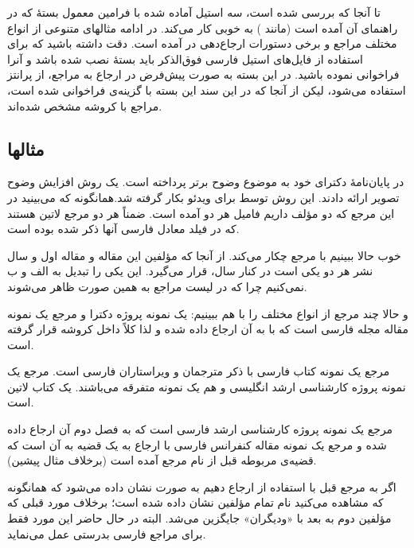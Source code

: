 \documentclass[a4paper]{article}
\theoremstyle{plain}\newtheorem{question}{پرسش}
\begin{document}
تا آنجا که بررسی شده است، سه استیل آماده شده با فرامین معمول بستهٔ  که در راهنمای آن آمده است (مانند ) به خوبی کار می‌کند. در ادامه مثالهای متنوعی از انواع مختلف مراجع و برخی دستورات ارجاع‌دهی در  آمده است. دقت داشته باشید که  برای استفاده از فایل‌های استیل فارسی فوق‌الذکر باید بستهٔ  نصب شده باشد و آنرا فراخوانی نموده باشید. در این بسته به صورت پیش‌فرض در ارجاع به مراجع، از پرانتز استفاده می‌شود، لیکن از آنجا که در این سند این بسته با گزینه‌ی  فراخوانی شده است، مراجع با کروشه مشخص شده‌اند. 

\subsection{مثالها}\label{Sec:examples}

\citet{Borman04thesis} در پایان‌نامهٔ دکترای خود به موضوع وضوح برتر پرداخته است.
\citet{Amintoosi09precise} یک روش افزایش وضوح تصویر ارائه دادند. این روش توسط \citet{Amintoosi09video} برای ویدئو بکار گرفته شد.همانگونه که می‌بینید در این مرجع که دو مؤلف داریم فامیل هر دو آمده است. ضمناً هر دو مرجع لاتین هستند که در فیلد  معادل فارسی آنها ذکر شده بوده است.

خوب حالا ببینیم با مرجع \citep{Amintoosi09regional} چکار می‌کند. از آنجا که مؤلفین این مقاله و مقاله اول و سال نشر هر دو یکی است در کنار سال،  قرار می‌گیرد. این یکی را تبدیل به الف و ب نمی‌کنیم چرا که در لیست مراجع به همین صورت ظاهر می‌شوند.

و حالا چند مرجع از انواع مختلف  را با هم ببینیم:  \citet{Omidali82phdThesis} یک نمونه پروژه دکترا و  مرجع \citep{Vahedi87} یک نمونه مقاله مجله فارسی است که با  به آن ارجاع داده شده و لذا کلاً داخل کروشه قرار گرفته است.

مرجع \citep{Pedram80osool} یک نمونه کتاب فارسی با ذکر مترجمان و ویراستاران فارسی است. مرجع \citep{Khalighi07MscThesis}  یک نمونه پروژه کارشناسی ارشد انگلیسی و \citet{Khalighi87xepersian} هم یک نمونه متفرقه  می‌باشند.\citet{Gonzalez02book} یک کتاب لاتین است.

 مرجع \citet[فصل ۲]{Pourmousa88mscThesis} یک نمونه پروژه کارشناسی ارشد فارسی است که به فصل دوم آن ارجاع داده شده و مرجع \citep[قضیه‌ی ۲،][]{Amintoosi87afzayesh}  یک نمونه  مقاله کنفرانس فارسی با ارجاع به یک قضیه به آن است که قضیه‌ی مربوطه قبل از نام مرجع آمده است (برخلاف مثال پیشین).

 اگر به  مرجع قبل با استفاده از  ارجاع دهیم به صورت \citealp*{Amintoosi87afzayesh} نشان داده می‌شود که همانگونه که مشاهده می‌کنید نام تمام مؤلفین نشان داده شده است؛ برخلاف مورد قبلی که مؤلفین دوم به بعد با «ودیگران» جایگزین می‌شد. البته در حال حاضر این مورد فقط برای مراجع فارسی بدرستی عمل می‌نماید. 
\end{document}

